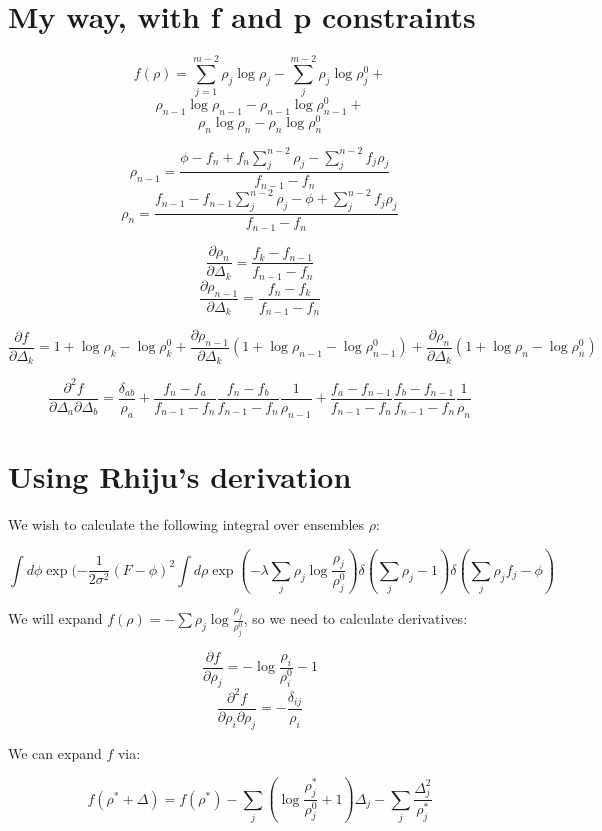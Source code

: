 \documentclass[12pt]{article}
\begin{document}
\section{My way, with f and p constraints}

$$f(\rho) = \sum_{j=1}^{m-2} \rho_j \log \rho_j - \sum_j^{m-2} \rho_j \log \rho_j^0 + $$
$$\rho_{n-1} \log \rho_{n-1} - \rho_{n-1} \log \rho_{n-1}^0 +$$
$$\rho_n \log \rho_n  - \rho_n \log \rho_n^0$$


$$\rho_{n-1} = \frac{\phi - f_n + f_n \sum_j^{n-2}  \rho_j - \sum_j^{n-2} f_j \rho_j}{f_{n-1} - f_n}$$
$$\rho_{n} = \frac{f_{n-1} - f_{n-1}\sum_{j}^{n-2} \rho_j  - \phi  + \sum_j^{n-2} f_j \rho_j}{f_{n-1} - f_n}$$

$$\frac{\partial \rho_n}{\partial \Delta_k} = \frac{f_k - f_{n-1}}{f_{n-1} - f_n}$$
$$\frac{\partial \rho_{n-1}}{\partial \Delta_k} = \frac{f_n - f_k}{f_{n-1} - f_n}$$

$$\frac{\partial f}{\partial \Delta_k} = 1 + \log \rho_k - \log \rho_k^0 + \frac{\partial \rho_{n-1}}{\partial \Delta_k} (1 + \log \rho_{n-1} - \log \rho_{n-1}^0) + \frac{\partial \rho_{n}}{\partial \Delta_k} (1 + \log \rho_{n} - \log \rho_{n}^0)$$

$$\frac{\partial^2 f}{\partial \Delta_a \partial \Delta_b} = \frac{\delta_{ab}}{\rho_a} + \frac{f_n - f_a}{f_{n-1} - f_n} \frac{f_n - f_b}{f_{n-1} - f_n} \frac{1}{\rho_{n-1}} + \frac{f_a - f_{n-1}}{f_{n-1} - f_n} \frac{f_b - f_{n-1}}{f_{n-1} - f_n} \frac{1}{\rho_n}$$

\section{Using Rhiju's derivation}

We wish to calculate the following integral over ensembles $\rho$:

$$\int d\phi \exp(-\frac{1}{2 \sigma^2} (F - \phi)^2 \int d\rho  \exp(-\lambda \sum_j \rho_j \log \frac{\rho_j}{\rho_j^0}) \delta(\sum_j \rho_j - 1) \delta(\sum_j \rho_j f_j - \phi)$$

We will expand $f(\rho) = -\sum \rho_j \log \frac{\rho_j}{\rho_j^0}$, so we need to calculate derivatives:

$$\frac{\partial f }{\partial \rho_j} = - \log \frac{\rho_i}{\rho_i^0} - 1$$
$$\frac{\partial^2 f}{\partial \rho_i \partial \rho_j} = - \frac{\delta_{ij}}{\rho_i}$$

We can expand $f$ via:

$$f(\rho^* + \Delta) = f(\rho^*) -  \sum_j (\log \frac{\rho_j^*}{\rho_j^0} + 1) \Delta_j - \sum_j \frac{\Delta_j^2}{\rho_j^*}$$
\end{document}
